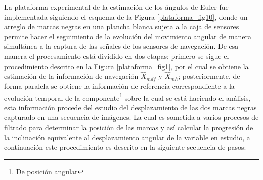\documentclass[10pt]{report}
\numberwithin{equation}{chapter}
\numberwithin{algorithm}{chapter}
\begin{document}
La plataforma experimental de la estimación de los ángulos de Euler fue implementada siguiendo el esquema de la Figura \ref{plataforma_fig10}, donde un arreglo de marcas negras en una plancha blanca sujeta a la caja de sensores permite hacer el seguimiento de la evolución del movimiento angular de manera simultánea a la captura de las señales de los sensores de navegación. De esa manera el procesamiento está dividido en dos etapas: primero se sigue el procedimiento descrito en la Figura \ref{plataforma_fig1}, por el cual se obtiene la estimación de la información de navegación $\hat{X}_{mdf}$ y $\hat{X}_{mh}$; posteriormente, de forma paralela se obtiene la información de referencia correspondiente a la evolución temporal de la componente\footnote{De posición angular} sobre la cual se está haciendo el análisis, esta información procede del estudio del desplazamiento de las dos marcas negras capturado en una secuencia de imágenes. La cual es sometida a varios procesos de filtrado para determinar la posición de las marcas y así calcular la progresión de la inclinación equivalente al desplazamiento angular de la variable en estudio, a continuación este procedimiento es descrito en la siguiente secuencia de pasos:
\end{document}

